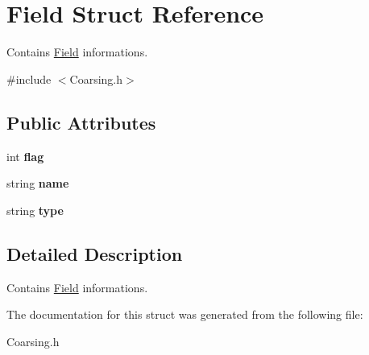 \hypertarget{structField}{}\section{Field Struct Reference}
\label{structField}


Contains \hyperlink{structField}{Field} informations.  




{\ttfamily \#include $<$Coarsing.\+h$>$}

\subsection*{Public Attributes}
\begin{DoxyCompactItemize}
\item 
\mbox{\label{structField_aac7e5b0b2e4c87d0ef057b71ea5fed97}} 
int {\bfseries flag}
\item 
\mbox{\label{structField_ab285d25456aca13adb626a89208d3dc2}} 
string {\bfseries name}
\item 
\mbox{\label{structField_a64da0458381eb5ef333274b4d5fa416e}} 
string {\bfseries type}
\end{DoxyCompactItemize}


\subsection{Detailed Description}
Contains \hyperlink{structField}{Field} informations. 

The documentation for this struct was generated from the following file\+:\begin{DoxyCompactItemize}
\item 
Coarsing.\+h\end{DoxyCompactItemize}
